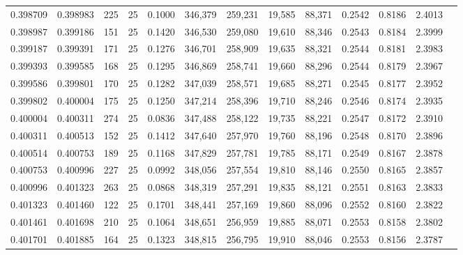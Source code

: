\begin{tabular}{rrrrrrrrrrrrr}
0.398709 & 0.398983 &   225 &  25 &                                     0.1000 & 346,379 & 259,231 &  19,585 &  88,371 & 0.2542 & 0.8186 & 2.4013 \\
0.398987 & 0.399186 &   151 &  25 &                                     0.1420 & 346,530 & 259,080 &  19,610 &  88,346 & 0.2543 & 0.8184 & 2.3999 \\
0.399187 & 0.399391 &   171 &  25 &                                     0.1276 & 346,701 & 258,909 &  19,635 &  88,321 & 0.2544 & 0.8181 & 2.3983 \\
0.399393 & 0.399585 &   168 &  25 &                                     0.1295 & 346,869 & 258,741 &  19,660 &  88,296 & 0.2544 & 0.8179 & 2.3967 \\
0.399586 & 0.399801 &   170 &  25 &                                     0.1282 & 347,039 & 258,571 &  19,685 &  88,271 & 0.2545 & 0.8177 & 2.3952 \\
0.399802 & 0.400004 &   175 &  25 &                                     0.1250 & 347,214 & 258,396 &  19,710 &  88,246 & 0.2546 & 0.8174 & 2.3935 \\
0.400004 & 0.400311 &   274 &  25 &                                     0.0836 & 347,488 & 258,122 &  19,735 &  88,221 & 0.2547 & 0.8172 & 2.3910 \\
0.400311 & 0.400513 &   152 &  25 &                                     0.1412 & 347,640 & 257,970 &  19,760 &  88,196 & 0.2548 & 0.8170 & 2.3896 \\
0.400514 & 0.400753 &   189 &  25 &                                     0.1168 & 347,829 & 257,781 &  19,785 &  88,171 & 0.2549 & 0.8167 & 2.3878 \\
0.400753 & 0.400996 &   227 &  25 &                                     0.0992 & 348,056 & 257,554 &  19,810 &  88,146 & 0.2550 & 0.8165 & 2.3857 \\
0.400996 & 0.401323 &   263 &  25 &                                     0.0868 & 348,319 & 257,291 &  19,835 &  88,121 & 0.2551 & 0.8163 & 2.3833 \\
0.401323 & 0.401460 &   122 &  25 &                                     0.1701 & 348,441 & 257,169 &  19,860 &  88,096 & 0.2552 & 0.8160 & 2.3822 \\
0.401461 & 0.401698 &   210 &  25 &                                     0.1064 & 348,651 & 256,959 &  19,885 &  88,071 & 0.2553 & 0.8158 & 2.3802 \\
0.401701 & 0.401885 &   164 &  25 &                                     0.1323 & 348,815 & 256,795 &  19,910 &  88,046 & 0.2553 & 0.8156 & 2.3787 \\

\end{tabular}
